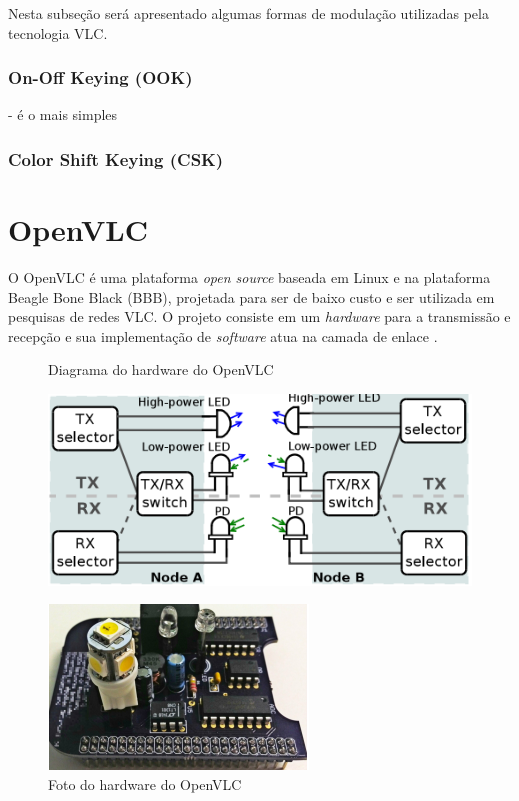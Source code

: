 Nesta subseção será apresentado algumas formas de modulação utilizadas pela tecnologia VLC.

\subsubsection{On-Off Keying (OOK)}

- é o mais simples

\subsubsection{Color Shift Keying (CSK)}

\section{OpenVLC}

O OpenVLC é uma plataforma \textit{open source} baseada em  Linux e na plataforma Beagle Bone Black (BBB), projetada para ser de baixo custo e ser utilizada em pesquisas de redes VLC. O projeto consiste em um \textit{hardware} para a transmissão e recepção e sua implementação de \textit{software} atua na camada de enlace \cite{OpenVLCB}.

\begin{figure}[htbp]
  \begin{minipage}{0.4\textwidth}
    \caption{Diagrama do hardware do OpenVLC}
    \includegraphics[scale=0.55]{images/diagram_cape_OpenVLC.png}
    \label{figura:diagramaVLC}
  \end{minipage}
  \hfill
  \begin{minipage}{0.4\textwidth}
    \centering
    \caption{Foto do hardware do OpenVLC} \label{fig_minipage_imagem1}
    \includegraphics[scale=0.8]{images/Cape.png}
  \end{minipage}
\end{figure}

